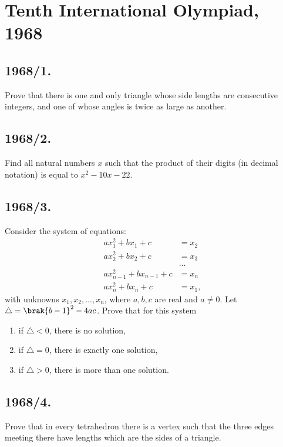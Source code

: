 \documentclass{article}
\begin{document}
  

\section*{Tenth International Olympiad, 1968}

\subsection*{1968/1.}
Prove that there is one and only triangle whose side lengths are consecutive integers, and one of whose angles is twice as large as another.

\subsection*{1968/2.}
Find all natural numbers $x$ such that the product of their digits (in decimal notation) is equal to $x^{2} - 10x - 22$.

\subsection*{1968/3.}
Consider the system of equations:                     
    \begin{align}
        a x_{1}^{2} + b x_{1} + c &= x_{2} \\
        a x_{2}^{2} + b x_{2} + c &= x_{3} \\
        &\hdots \\
        a x_{n-1}^{2} + b x_{n-1} + c &= x_{n} \\
        a x_{n}^{2} + b x_{n} + c &= x_{1},
    \end{align}
		\noindent with unknowns $x_{1},x_{2},\hdots,x_{n}$, where $a,b,c$ are real and $a \not= 0$. Let $\triangle = \brak{b - 1}^{2} - 4ac$. Prove that for this system
		\begin{enumerate}
			\item if $\triangle < 0$, there is no solution,
			\item if $\triangle = 0$, there is exactly one solution,
			\item if $\triangle > 0$, there is more than one solution.
		\end{enumerate}

\subsection*{1968/4.}
Prove that in every tetrahedron there is a vertex such that the three edges meeting there have lengths which are the sides of a triangle.
\end{document}
